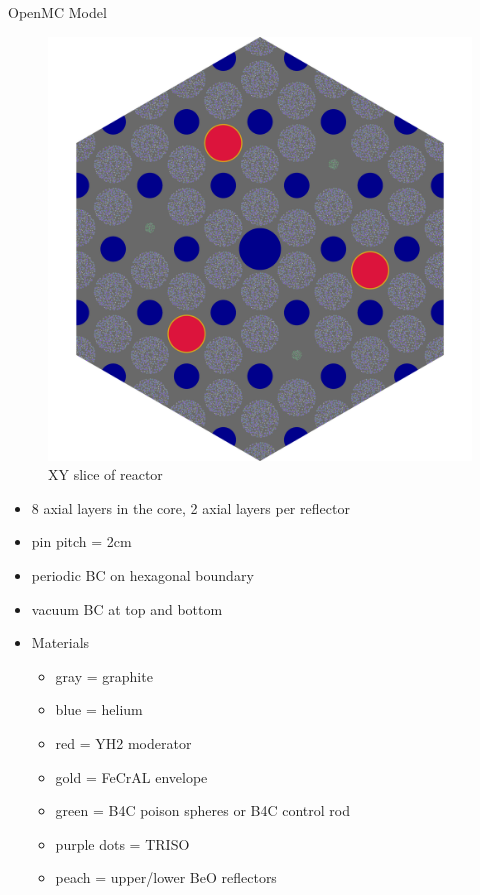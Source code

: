 \documentclass[9pt,t,aspectratio=169]{beamer}
\begin{document}
\begin{frame}{OpenMC Model}
\begin{minipage}[t]{0.35\linewidth}
\begin{figure}
            \includegraphics[height=0.7\textheight]{figures/gcmr_slice.png}
            \caption{XY slice of reactor}
        \end{figure}
    \end{minipage}
    \hfill%
    \begin{minipage}[t]{0.4\linewidth}
        \begin{itemize}
        \item 8 axial layers in the core, 2 axial layers per reflector
        \item pin pitch = 2cm 
        \item periodic BC on hexagonal boundary
        \item vacuum BC at top and bottom 
        \item Materials 
            \begin{itemize}
                \item gray = graphite
                \item blue = helium 
                \item red = YH2 moderator
                \item gold = FeCrAL envelope
                \item green = B4C poison spheres or B4C control rod
                \item purple dots = TRISO
                \item peach = upper/lower BeO reflectors
            \end{itemize}
        \end{itemize}
    \end{minipage}
\end{frame}
\end{document}
